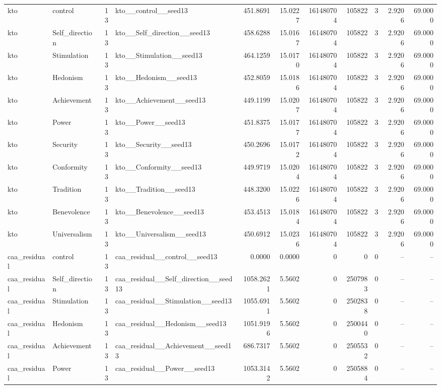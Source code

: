\begin{tabular}{llrlrrrrrrr}
kto & control & 13 & kto\_\_control\_\_seed13 & 451.8691 & 15.0227 & 161480704 & 105822 & 3 & 2.9206 & 69.0000 \\
kto & Self\_direction & 13 & kto\_\_Self\_direction\_\_seed13 & 458.6288 & 15.0167 & 161480704 & 105822 & 3 & 2.9206 & 69.0000 \\
kto & Stimulation & 13 & kto\_\_Stimulation\_\_seed13 & 464.1259 & 15.0170 & 161480704 & 105822 & 3 & 2.9206 & 69.0000 \\
kto & Hedonism & 13 & kto\_\_Hedonism\_\_seed13 & 452.8059 & 15.0186 & 161480704 & 105822 & 3 & 2.9206 & 69.0000 \\
kto & Achievement & 13 & kto\_\_Achievement\_\_seed13 & 449.1199 & 15.0207 & 161480704 & 105822 & 3 & 2.9206 & 69.0000 \\
kto & Power & 13 & kto\_\_Power\_\_seed13 & 451.8375 & 15.0177 & 161480704 & 105822 & 3 & 2.9206 & 69.0000 \\
kto & Security & 13 & kto\_\_Security\_\_seed13 & 450.2696 & 15.0172 & 161480704 & 105822 & 3 & 2.9206 & 69.0000 \\
kto & Conformity & 13 & kto\_\_Conformity\_\_seed13 & 449.9719 & 15.0204 & 161480704 & 105822 & 3 & 2.9206 & 69.0000 \\
kto & Tradition & 13 & kto\_\_Tradition\_\_seed13 & 448.3200 & 15.0226 & 161480704 & 105822 & 3 & 2.9206 & 69.0000 \\
kto & Benevolence & 13 & kto\_\_Benevolence\_\_seed13 & 453.4513 & 15.0184 & 161480704 & 105822 & 3 & 2.9206 & 69.0000 \\
kto & Universalism & 13 & kto\_\_Universalism\_\_seed13 & 450.6912 & 15.0236 & 161480704 & 105822 & 3 & 2.9206 & 69.0000 \\
caa\_residual & control & 13 & caa\_residual\_\_control\_\_seed13 & 0.0000 & 0.0000 & 0 & 0 & 0 & -- & -- \\
caa\_residual & Self\_direction & 13 & caa\_residual\_\_Self\_direction\_\_seed13 & 1058.2621 & 5.5602 & 0 & 2507983 & 0 & -- & -- \\
caa\_residual & Stimulation & 13 & caa\_residual\_\_Stimulation\_\_seed13 & 1055.6911 & 5.5602 & 0 & 2502838 & 0 & -- & -- \\
caa\_residual & Hedonism & 13 & caa\_residual\_\_Hedonism\_\_seed13 & 1051.9196 & 5.5602 & 0 & 2500440 & 0 & -- & -- \\
caa\_residual & Achievement & 13 & caa\_residual\_\_Achievement\_\_seed13 & 686.7317 & 5.5602 & 0 & 2505532 & 0 & -- & -- \\
caa\_residual & Power & 13 & caa\_residual\_\_Power\_\_seed13 & 1053.3142 & 5.5602 & 0 & 2505884 & 0 & -- & -- \\

\end{tabular}
